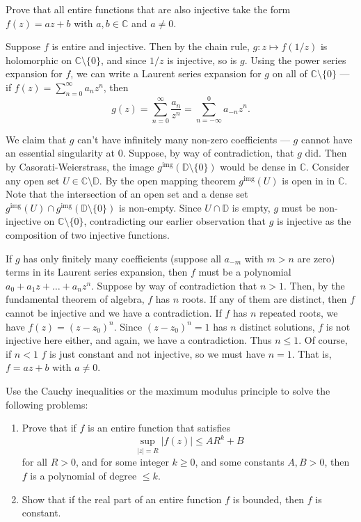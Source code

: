 \documentclass[12 pt, letterpaper]{hmcpset}
\begin{document}
\begin{problem}[14.]
	Prove that all entire functions that are also injective take the form $f(z) = az + b$ with $a, b \in \mathbb{C}$ and $a \neq 0$.
\end{problem}

\begin{solution}
	Suppose $f$ is entire and injective. Then by the chain rule, $g : z \mapsto f(1/z)$ is holomorphic on $\mathbb{C} \setminus \{ 0 \}$, and since $1/z$ is injective, so is $g$. Using the power series expansion for $f$, we can write a Laurent series expansion for $g$ on all of $\mathbb{C} \setminus \{ 0 \}$ --- if $f(z) = \sum_{n = 0}^{\infty} a_{n} z^{n}$, then
	\[
		g(z) = \sum_{n = 0}^{\infty} \frac{a_{n}}{z^{n}} = \sum_{n = -\infty}^{0} a_{-n} z^{n}.
	\]

	We claim that $g$ can't have infinitely many non-zero coefficients --- $g$ cannot have an essential singularity at $0$. Suppose, by way of contradiction, that $g$ did. Then by Casorati-Weierstrass, the image $g^{\text{img}}(\mathbb{D} \setminus \{ 0 \})$ would be dense in $\mathbb{C}$. Consider any open set $U \in \mathbb{C} \setminus \mathbb{D}$. By the open mapping theorem $g^{\text{img}}(U)$ is open in in $\mathbb{C}$. Note that the intersection of an open set and a dense set $g^{\text{img}}(U) \cap g^{\text{img}}(\mathbb{D} \setminus \{ 0 \})$ is non-empty. Since $U \cap \mathbb{D}$ is empty, $g$ must be non-injective on $\mathbb{C} \setminus \{ 0 \}$, contradicting our earlier observation that $g$ is injective as the composition of two injective functions.

	If $g$ has only finitely many coefficients (suppose all $a_{-m}$ with $m > n$ are zero) terms in its Laurent series expansion, then $f$ must be a polynomial $a_{0} + a_{1} z + \dots + a_{n} z^{n}$. Suppose by way of contradiction that $n > 1$. Then, by the fundamental theorem of algebra, $f$ has $n$ roots. If any of them are distinct, then $f$ cannot be injective and we have a contradiction. If $f$ has $n$ repeated roots, we have $f(z) = (z - z_{0})^{n}$. Since $(z - z_{0})^{n} = 1$ has $n$ distinct solutions, $f$ is not injective here either, and again, we have a contradiction. Thus $n \le 1$. Of course, if $n < 1$ $f$ is just constant and not injective, so we must have $n = 1$. That is, $f = az + b$ with $a \neq 0$.
\end{solution}

\pagebreak

\begin{problem}[15.]
	Use the Cauchy inequalities or the maximum modulus principle to solve the following problems:
	\begin{enumerate}
		\item Prove that if $f$ is an entire function that satisfies
			\[
				\sup_{\lvert z \rvert = R} \lvert f(z) \rvert \le A R^{k} + B
			\]
			for all $R > 0$, and for some integer $k \ge 0$, and some constants $A, B > 0$, then $f$ is a polynomial of degree $\le k$.
		\setcounter{enumi}{3}
		\item Show that if the real part of an entire function $f$ is bounded, then $f$ is constant.
	\end{enumerate}
\end{problem}
\end{document}
